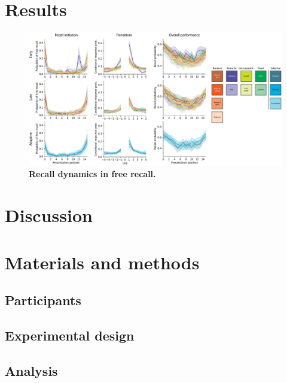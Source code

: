 \documentclass[10pt]{article}
\begin{document}



\section*{Results}

\begin{figure}[tp]
    \centering
    \includegraphics[width=\textwidth]{figures/recall_dynamics}
    \caption{\textbf{Recall dynamics in free recall.}}
    \label{fig:recall-dynamics}
\end{figure}








\section*{Discussion}





\section*{Materials and methods}
\subsection*{Participants}

\subsection*{Experimental design}

\subsection*{Analysis}



\end{document}
